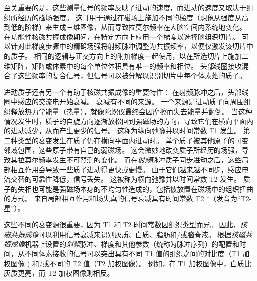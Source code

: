 至关重要的是，这些测量信号的频率反映了进动的速度，而进动的速度又取决于组织所经历的磁场强度。
这可用于通过在磁场上施加不同的梯度（想象从强度从高到低的阶梯）来生成三维图像，从而导致拉莫尔频率在大脑空间内系统地变化。
在功能性核磁共振成像期间，在特定方向上应用一个梯度以选择脑组织切片。
可以针对此梯度步骤中的精确场强将射频脉冲调整为共振频率，以便仅激发该切片中的质子。
相同的逻辑与正交方向上的附加梯度一起使用，以在所选切片上施加二维矩阵，矩阵或体素中的每个单位体积具有唯一的频率和相位。
头部线圈接收混合了这些频率的复合信号，但信号可以被分解以识别切片中每个体素处的质子。


进动质子还有另一个有助于核磁共振成像的重要特性：
在射频脉冲之后，头部线圈中感应的交流电开始衰减。
衰减有不同的来源。
一个来源是进动质子向周围组织释放热力学能量（热量），就像陀螺仪最终会因摩擦而失去能量并翻倒。
当这种情况发生时，质子的自旋方向逐渐放松回到强磁场的方向，导致它们在横向平面内的进动减少，从而产生更少的信号。
这称为纵向弛豫并以时间常数 T1 发生。
第二种类型的衰变发生在质子仍在横向平面内进动时。
单个质子被其他原子的可变邻域包围，这些原子带有自己的弱磁场。
这会微妙地改变质子所经历的场强，导致其拉莫尔频率发生不可预测的变化。
而在\textit{射频}脉冲质子同步进动之后，这些局部相互作用会导致一些质子进动得更快或更慢。
由于它们越来越不同步，感应电流交替的可靠性降低，信号丢失。
这被称为横向弛豫并以时间常数 T2 发生。 
质子的失相也可能是强磁场本身的不均匀性造成的，包括被放置在磁场中的组织扭曲的方式。
来自局部相互作用和场失真的信号衰减具有时间常数 T2 *（发音为“T2-星”）。


这些不同的衰变源很重要，因为 T1 和 T2 时间常数因组织类型而异。 
因此，\textit{核磁共振成像}可以利用信号衰减来识别灰质、白质、脂肪和/或脑脊液。 
根据\textit{核磁共振成像}机器上设置的\textit{射频}脉冲、梯度和其他参数（统称为脉冲序列）的配置和时间，从不同体素接收的信号可以突出具有不同 T1 值的组织之间的对比度（T1 加权图像 ) 和/或不同的 T2 值（T2 加权图像）。 
例如，在 T1 加权图像中，白质比灰质更亮，而 T2 加权图像则相反。


